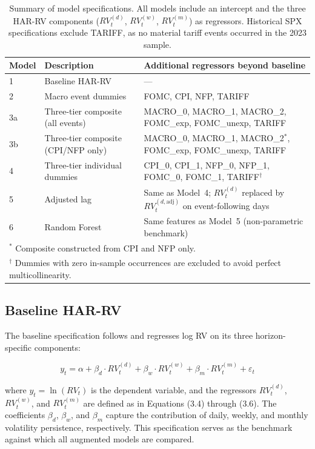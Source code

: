 \documentclass[12pt,a4paper]{report}
\begin{document}
\begin{table}[H]
\centering
\small
\begin{tabular}{llp{7.5cm}}
\hline
\textbf{Model} & \textbf{Description} & \textbf{Additional regressors beyond baseline} \\
\hline
1 & Baseline HAR-RV & --- \\
2 & Macro event dummies & FOMC, CPI, NFP, TARIFF \\
3a & Three-tier composite (all events) & MACRO\_0, MACRO\_1, MACRO\_2, FOMC\_exp, FOMC\_unexp, TARIFF \\
3b & Three-tier composite (CPI/NFP only) & MACRO\_0, MACRO\_1, MACRO\_2$^*$, FOMC\_exp, FOMC\_unexp, TARIFF \\
4 & Three-tier individual dummies & CPI\_0, CPI\_1, NFP\_0, NFP\_1, FOMC\_0, FOMC\_1, TARIFF$^\dagger$ \\
5 & Adjusted lag & Same as Model~4; $RV_t^{(d)}$ replaced by $RV_t^{(d,\text{adj})}$ on event-following days \\
6 & Random Forest & Same features as Model~5 (non-parametric benchmark) \\
\hline
\multicolumn{3}{l}{\footnotesize $^*$ Composite constructed from CPI and NFP only.} \\
\multicolumn{3}{l}{\footnotesize $^\dagger$ Dummies with zero in-sample occurrences are excluded to avoid perfect multicollinearity.} \\
\end{tabular}
\caption{Summary of model specifications. All models include an intercept and the three HAR-RV components ($RV_t^{(d)}$, $RV_t^{(w)}$, $RV_t^{(m)}$) as regressors. Historical SPX specifications exclude TARIFF, as no material tariff events occurred in the 2023 sample.}
\label{tab:model_summary}
\end{table}

\subsection{Baseline HAR-RV}
The baseline specification follows \cite{Corsi2009} and regresses log RV on its three horizon-specific components:

\begin{equation}
y_t = \alpha + \beta_d \cdot RV_t^{(d)} + \beta_w \cdot RV_t^{(w)} + \beta_m \cdot RV_t^{(m)} + \varepsilon_t
\end{equation}

\noindent where $y_t = \ln(RV_t)$ is the dependent variable, and the regressors $RV_t^{(d)}$, $RV_t^{(w)}$, and $RV_t^{(m)}$ are defined as in Equations (3.4) through (3.6). The coefficients $\beta_d$, $\beta_w$, and $\beta_m$ capture the contribution of daily, weekly, and monthly volatility persistence, respectively. This specification serves as the benchmark against which all augmented models are compared.
\end{document}
